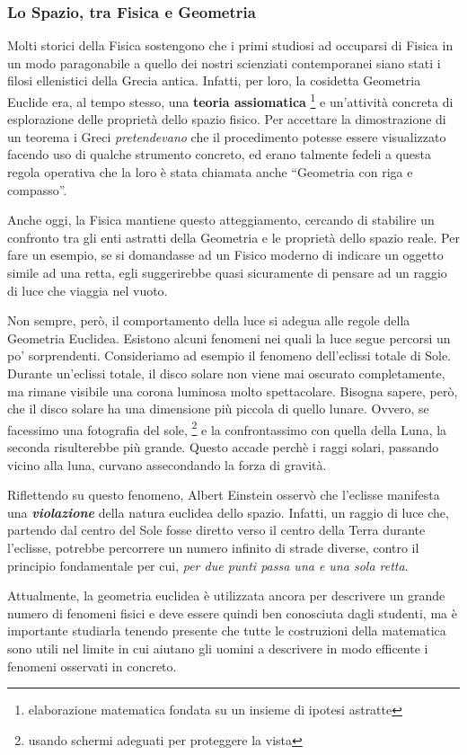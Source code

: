 \subsubsection*{Lo Spazio, tra Fisica e Geometria}

Molti storici della Fisica sostengono che i primi studiosi ad occuparsi di Fisica in un modo paragonabile a quello dei nostri scienziati contemporanei siano stati i filosi ellenistici della Grecia antica.
Infatti, per loro, la cosidetta Geometria Euclide era, al tempo stesso, una {\bfseries teoria assiomatica} \footnote{elaborazione matematica fondata su un insieme di ipotesi astratte} e un'attività concreta di esplorazione delle proprietà dello spazio fisico. Per accettare la dimostrazione di un teorema i Greci {\slshape pretendevano} che il procedimento potesse essere visualizzato facendo uso di qualche strumento concreto, ed erano talmente fedeli a questa regola operativa che la loro è stata chiamata anche ``Geometria con riga e compasso''. 
\newline

Anche oggi, la Fisica mantiene questo atteggiamento, cercando di stabilire un confronto tra gli enti astratti della Geometria e le proprietà dello spazio reale. Per fare un esempio, se si domandasse ad un Fisico moderno di indicare un oggetto simile ad una retta, egli suggerirebbe quasi sicuramente di pensare ad un raggio di luce che viaggia nel vuoto.
\newline

Non sempre, però, il comportamento della luce si adegua alle regole della Geometria Euclidea. Esistono alcuni fenomeni nei quali la luce segue percorsi un po' sorprendenti. Consideriamo ad esempio il fenomeno dell'eclissi totale di Sole.
\newline
Durante un'eclissi totale, il disco solare non viene mai oscurato completamente, ma rimane visibile una corona luminosa molto spettacolare. Bisogna sapere, però, che il disco solare ha una dimensione più piccola di quello lunare. Ovvero, se facessimo una fotografia del sole, \footnote {usando schermi adeguati per proteggere la vista} e la confrontassimo con quella della Luna, la seconda risulterebbe più grande. Questo accade perchè i raggi solari, passando vicino alla luna, curvano assecondando la forza di gravità.
\newline

Riflettendo su questo fenomeno, Albert Einstein osservò che l'eclisse manifesta una {\bfseries {\slshape violazione}} della natura euclidea dello spazio. Infatti, un raggio di luce che, partendo dal centro del Sole fosse diretto verso il centro della Terra durante l'eclisse, potrebbe percorrere un numero infinito di strade diverse, contro il principio fondamentale per cui, {\slshape per due punti passa una e una sola retta}. 
\newline

Attualmente, la geometria euclidea è utilizzata ancora per descrivere un grande numero di fenomeni fisici e deve essere quindi ben conosciuta dagli studenti, ma è importante studiarla tenendo presente che tutte le costruzioni della matematica sono utili nel limite in cui aiutano gli uomini a descrivere in modo efficente i fenomeni osservati in concreto.
